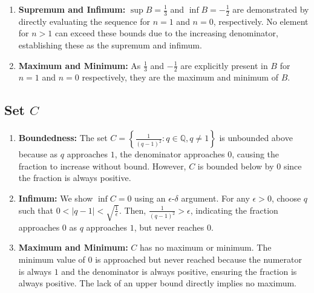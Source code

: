 \documentclass[10pt]{article}
\newenvironment{problem}[2][Problem]{\begin{trivlist}
\item[\hskip \labelsep {\bfseries #1}\hskip \labelsep {\bfseries #2.}]}{\end{trivlist}}
\begin{document}
\begin{problem}{4}
\begin{enumerate}
    \item \textbf{Supremum and Infimum:} $\sup B = \frac{1}{3}$ and $\inf B = -\frac{1}{2}$ are demonstrated by directly evaluating the sequence for $n=1$ and $n=0$, respectively. No element for $n > 1$ can exceed these bounds due to the increasing denominator, establishing these as the supremum and infimum.
    
    \item \textbf{Maximum and Minimum:} As $\frac{1}{3}$ and $-\frac{1}{2}$ are explicitly present in $B$ for $n=1$ and $n=0$ respectively, they are the maximum and minimum of $B$.
\end{enumerate}

\subsection*{Set $C$}
\begin{enumerate}
    \item \textbf{Boundedness:} The set $C = \left\{\frac{1}{(q-1)^2} : q \in \mathbb{Q}, q \neq 1\right\}$ is unbounded above because as $q$ approaches $1$, the denominator approaches $0$, causing the fraction to increase without bound. However, $C$ is bounded below by $0$ since the fraction is always positive.
    
    \item \textbf{Infimum:} We show $\inf C = 0$ using an $\epsilon$-$\delta$ argument. For any $\epsilon > 0$, choose $q$ such that $0 < |q - 1| < \sqrt{\frac{1}{\epsilon}}$. Then, $\frac{1}{(q-1)^2} > \epsilon$, indicating the fraction approaches $0$ as $q$ approaches $1$, but never reaches $0$.
    
    \item \textbf{Maximum and Minimum:} $C$ has no maximum or minimum. The minimum value of $0$ is approached but never reached because the
        numerator is always $1$ and the denominator is always positive, ensuring the fraction is always positive.
        The lack of an upper bound directly implies no maximum.
\end{enumerate}

\end{problem}
\medskip
\end{document}
